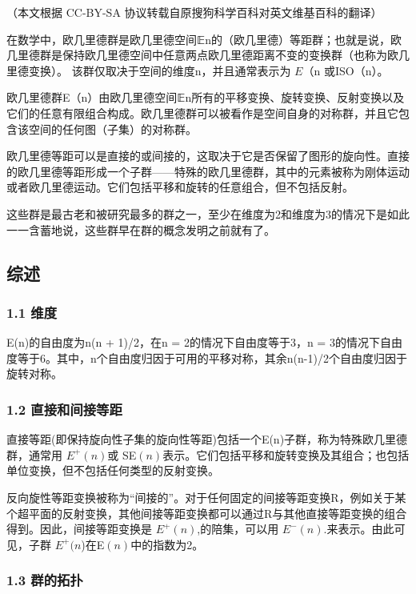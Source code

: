 
（本文根据 CC-BY-SA 协议转载自原搜狗科学百科对英文维基百科的翻译）

在数学中，欧几里德群是欧几里德空间𝔼n的（欧几里德）等距群；也就是说，欧几里德群是保持欧几里德空间中任意两点欧几里德距离不变的变换群（也称为欧几里德变换）。 该群仅取决于空间的维度n，并且通常表示为 $E$（n 或ISO（n）。

欧几里德群E（n）由欧几里德空间𝔼n所有的平移变换、旋转变换、反射变换以及它们的任意有限组合构成。欧几里德群可以被看作是空间自身的对称群，并且它包含该空间的任何图（子集）的对称群。

欧几里德等距可以是直接的或间接的，这取决于它是否保留了图形的旋向性。直接的欧几里德等距形成一个子群——特殊的欧几里德群，其中的元素被称为刚体运动或者欧几里德运动。它们包括平移和旋转的任意组合，但不包括反射。

这些群是最古老和被研究最多的群之一，至少在维度为2和维度为3的情况下是如此一一含蓄地说，这些群早在群的概念发明之前就有了。

\subsection{综述}

\subsubsection{1.1 维度}

E(n)的自由度为n(n + 1)/2，在n = 2的情况下自由度等于3，n = 3的情况下自由度等于6。其中，n个自由度归因于可用的平移对称，其余n(n-1)/2个自由度归因于旋转对称。

\subsubsection{1.2 直接和间接等距}

直接等距(即保持旋向性子集的旋向性等距)包括一个E(n)子群，称为特殊欧几里德群，通常用 $E^+(n)$或 SE$(n)$表示。它们包括平移和旋转变换及其组合；也包括单位变换，但不包括任何类型的反射变换。

反向旋性等距变换被称为“间接的”。对于任何固定的间接等距变换R，例如关于某个超平面的反射变换，其他间接等距变换都可以通过R与其他直接等距变换的组合得到。因此，间接等距变换是 $E^+(n)$,的陪集，可以用 $E^-(n)$.来表示。由此可见，子群 $E^+(n$)在E$(n)$中的指数为2。

\subsubsection{1.3 群的拓扑}

